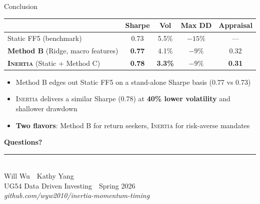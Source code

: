 \documentclass[aspectratio=169, 12pt]{beamer}
\newcommand{\fundname}{\textsc{Inertia}}
\newcommand{\emphp}[1]{{\color{inertiapurple}\textbf{#1}}}
\newcommand{\emphb}[1]{{\color{inertiablue}\textbf{#1}}}
\begin{document}
\begin{frame}{Conclusion}
  \vspace{8pt}
  \begin{center}
    \footnotesize
    \begin{tabular}{lcccc}
      \toprule
       & \textbf{Sharpe} & \textbf{Vol} & \textbf{Max DD} & \textbf{Appraisal} \\
      \midrule
      Static FF5 (benchmark) & 0.73 & 5.5\% & $-15\%$ & --- \\
      \emphp{Method B} (Ridge, macro features) & \emphp{0.77} & 4.1\% & $-9\%$ & 0.32 \\
      \rowcolor{lightpurple}
      \emphp{\fundname{}} (Static + Method C) & \emphp{0.78} & \emphp{3.3\%} & \emphp{$-9\%$} & \emphp{\textbf{0.31}} \\
      \bottomrule
    \end{tabular}
  \end{center}
  \vspace{8pt}
  \begin{itemize}\setlength{\itemsep}{2pt}
    \item Method B edges out Static FF5 on a stand-alone Sharpe basis (0.77 vs 0.73)
    \item \fundname{} delivers a similar Sharpe (0.78) at \emphp{40\% lower volatility} and shallower drawdown
    \item \emphb{Two flavors}: Method B for return seekers, \fundname{} for risk-averse mandates
  \end{itemize}
\end{frame}

\begin{frame}[plain]
  \vspace{1.5cm}
  \begin{center}
    {\Huge\bfseries\color{inertiapurple} Questions?}\\[24pt]
    {\color{inertiapurple}\rule{0.40\textwidth}{0.4pt}}\\[24pt]
    {\large Will Wu \,\textbullet\, Kathy Yang}\\[10pt]
    {\small UG54 Data Driven Investing\, \textbullet\, Spring 2026}\\[20pt]
    {\footnotesize\itshape github.com/wyw2010/inertia-momentum-timing}
  \end{center}
\end{frame}
\end{document}
